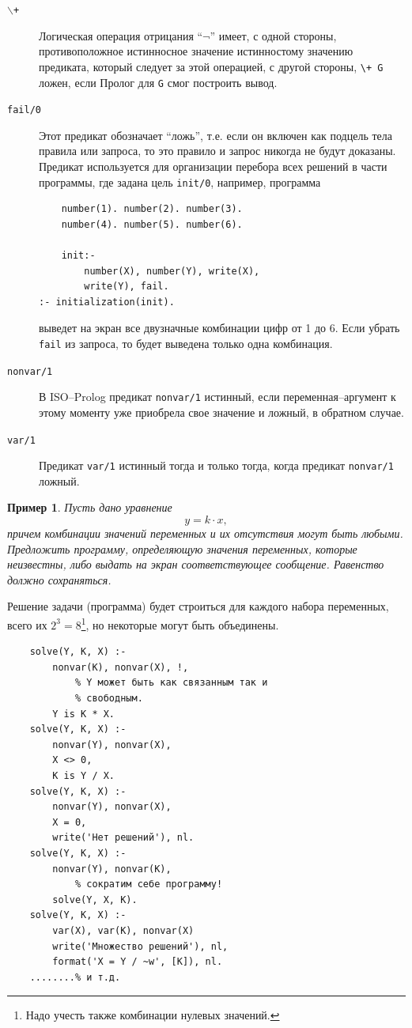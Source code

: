 \documentclass[12pt, openany, twoside]{book} %
\newtheorem{example}{Пример}[chapter]
\begin{document}
\begin{description}
\item[{\tt $\backslash$+}] Логическая операция отрицания ``$\neg$'' имеет, с одной стороны, противоположное истинносное значение истинностому значению пре\-ди\-ка\-та, который следует за этой операцией, с другой стороны, {\tt \verb|\+| G} ложен, если Пролог для  {\tt G} смог построить вывод.
\item[\tt fail/0] Этот предикат обозначает ``ложь'', т.е. если он включен как подцель тела правила или запроса, то это правило и запрос никогда не будут доказаны. Предикат используется для организации перебора всех решений в части программы, где задана цель \texttt{init/0}, например, программа
{\tt \begin{verbatim}
    number(1). number(2). number(3).
    number(4). number(5). number(6).

    init:-
        number(X), number(Y), write(X),
        write(Y), fail.
:- initialization(init).
\end{verbatim}}
выведет на экран все двузначные комбинации цифр от 1 до 6. Если убрать {\tt fail} из запроса, то будет выведена только одна комбинация.
\item[\tt nonvar/1] В ISO--Prolog предикат {\tt nonvar/1} истинный, если пе\-ре\-мен\-ная--аргумент к этому моменту уже приобрела свое значение и ложный, в обратном случае.
\item[\tt var/1] Предикат {\tt var/1} истинный тогда и только тогда, когда предикат {\tt nonvar/1} ложный.
\end{description}

\begin{example}  Пусть дано уравнение
$$
    y=k\cdot x,
$$
причем комбинации значений переменных и их отсутствия могут быть любыми. Предложить программу, определяющую значения переменных, которые неизвестны,  либо выдать на экран соответствующее сообщение. Равенство должно сохраняться.
\end{example}

Решение задачи (программа) будет строиться для каждого набора переменных, всего их $2^3=8$\footnote{Надо учесть также комбинации нулевых значений.}, но некоторые могут быть объединены.

{\tt \begin{verbatim}
    solve(Y, K, X) :-
        nonvar(K), nonvar(X), !,
            % Y может быть как связанным так и
            % свободным.
        Y is K * X.
    solve(Y, K, X) :-
        nonvar(Y), nonvar(X),
        X <> 0,
        K is Y / X.
    solve(Y, K, X) :-
        nonvar(Y), nonvar(X),
        X = 0,
        write('Нет решений'), nl.
    solve(Y, K, X) :-
        nonvar(Y), nonvar(K),
            % сократим себе программу!
        solve(Y, X, K).
    solve(Y, K, X) :-
        var(X), var(K), nonvar(X)
        write('Множество решений'), nl,
        format('X = Y / ~w', [K]), nl.
    ........% и т.д.
\end{verbatim}}
\end{document}

